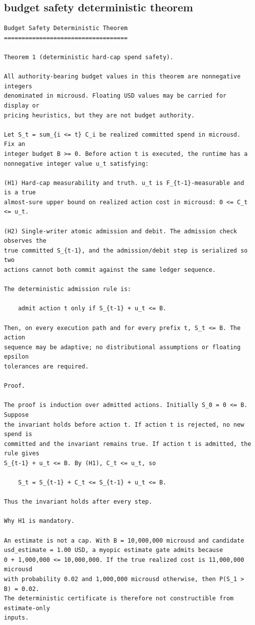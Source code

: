 \subsection{budget safety deterministic theorem}
\begin{small}
\begin{verbatim}
Budget Safety Deterministic Theorem
===================================

Theorem 1 (deterministic hard-cap spend safety).

All authority-bearing budget values in this theorem are nonnegative integers
denominated in microusd. Floating USD values may be carried for display or
pricing heuristics, but they are not budget authority.

Let S_t = sum_{i <= t} C_i be realized committed spend in microusd. Fix an
integer budget B >= 0. Before action t is executed, the runtime has a
nonnegative integer value u_t satisfying:

(H1) Hard-cap measurability and truth. u_t is F_{t-1}-measurable and is a true
almost-sure upper bound on realized action cost in microusd: 0 <= C_t <= u_t.

(H2) Single-writer atomic admission and debit. The admission check observes the
true committed S_{t-1}, and the admission/debit step is serialized so two
actions cannot both commit against the same ledger sequence.

The deterministic admission rule is:

    admit action t only if S_{t-1} + u_t <= B.

Then, on every execution path and for every prefix t, S_t <= B. The action
sequence may be adaptive; no distributional assumptions or floating epsilon
tolerances are required.

Proof.

The proof is induction over admitted actions. Initially S_0 = 0 <= B. Suppose
the invariant holds before action t. If action t is rejected, no new spend is
committed and the invariant remains true. If action t is admitted, the rule gives
S_{t-1} + u_t <= B. By (H1), C_t <= u_t, so

    S_t = S_{t-1} + C_t <= S_{t-1} + u_t <= B.

Thus the invariant holds after every step.

Why H1 is mandatory.

An estimate is not a cap. With B = 10,000,000 microusd and candidate
usd_estimate = 1.00 USD, a myopic estimate gate admits because
0 + 1,000,000 <= 10,000,000. If the true realized cost is 11,000,000 microusd
with probability 0.02 and 1,000,000 microusd otherwise, then P(S_1 > B) = 0.02.
The deterministic certificate is therefore not constructible from estimate-only
inputs.


\end{verbatim}
\end{small}
